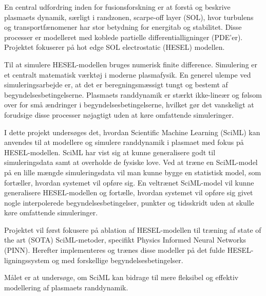 



En central udfordring inden for fusionsforskning er at forstå og beskrive plasmaets dynamik, 
særligt i randzonen, scarpe-off layer (SOL), hvor turbulens og transportfænomener har stor betydning for energitab og stabilitet.
Disse processer er modelleret med koblede partielle differentialligninger (PDE'er). 
Projektet fokuserer på hot edge SOL electrostatic (HESEL) modellen.\cite{PDE_til_plasma}

Til at simulere HESEL-modellen bruges numerisk finite difference. Simulering er et centralt matematisk værktøj i moderne plasmafysik.
En generel ulempe ved simuleringsarbejde er, at det er beregningsmæssigt tungt og bestemt af begyndelsesbetingelserne.
Plasmaets randdynamik er stærkt ikke-lineær og følsom over for små ændringer i begyndelsesbetingelserne, 
hvilket gør det vanskeligt at forudsige disse processer nøjagtigt uden at køre omfattende simuleringer.\cite{SciML_til_plasma}

I dette projekt undersøges det, hvordan Scientific Machine Learning (SciML) kan anvendes til at modellere og simulere 
randdynamik i plasmaet med fokus på HESEL-modellen.
SciML har vist sig at kunne generalisere godt til simuleringsdata samt at overholde de fysiske love. 
Ved at træne en SciML-model på en lille mængde simuleringsdata vil man kunne bygge en statistisk model, 
som fortæller, hvordan systemet vil opføre sig.
En veltrænet SciML-model vil kunne generalisere HESEL-modellen og fortælle, hvordan systemet vil opføre sig 
givet nogle interpolerede begyndelsesbetingelser, punkter og tidsskridt uden at skulle køre omfattende simuleringer.

Projektet vil først fokusere på ablation af HESEL-modellen 
til træning af state of the art (SOTA) SciML-metoder, specifikt Physics Informed Neural Networks (PINN).
Herefter implementeres og trænes disse modeller på det fulde HESEL-ligningssystem og med forskellige begyndelsesbetingelser.

Målet er at undersøge, om SciML kan bidrage til mere fleksibel og effektiv modellering af 
plasmaets randdynamik.